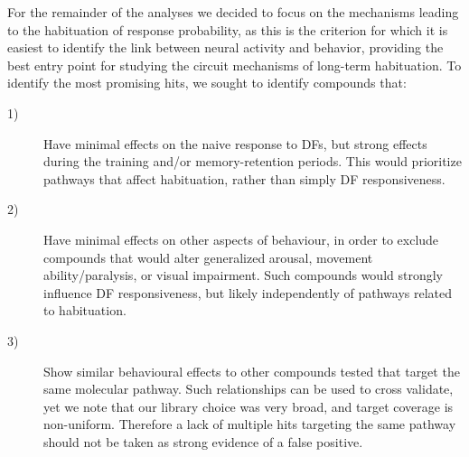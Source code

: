 \documentclass[9pt,lineno]{RandlettLab_elife}
\begin{document}
For the remainder of the analyses we decided to focus on the mechanisms leading to the habituation of response probability, as this is the criterion for which it is easiest to identify the link between neural activity and behavior, providing the best entry point for studying the circuit mechanisms of long-term habituation. To identify the most promising hits, we sought to identify compounds that:

\begin{description}
\item[1)] Have minimal effects on the naive response to DFs, but strong effects during the training and/or memory-retention periods. This would prioritize pathways that affect habituation, rather than simply DF responsiveness.

\item[2)] Have minimal effects on other aspects of behaviour, in order to exclude compounds that would alter generalized arousal, movement ability/paralysis, or visual impairment. Such compounds would strongly influence DF responsiveness, but likely independently of pathways related to habituation. 

\item[3)] Show similar behavioural effects to other compounds tested that target the same molecular pathway. Such relationships can be used to cross validate, yet we note that our library choice was very broad, and target coverage is non-uniform. Therefore a lack of multiple hits targeting the same pathway should not be taken as strong evidence of a false positive. 
\end{description}
\end{document}

